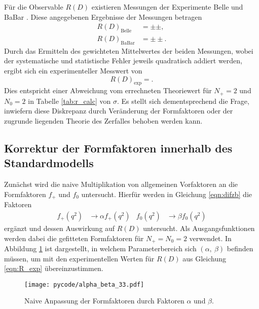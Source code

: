 Für die Observable $R(D)$ existieren Messungen der Experimente Belle \cite{PhysRevD.92.072014} und BaBar \cite{PhysRevLett.109.101802}.
Diese angegebenen Ergebnisse der Messungen betragen
\begin{align*}
  R(D)_\text{Belle} &=  \pm  \pm  ,\\
  R(D)_\text{BaBar} &=  \pm  \pm .
\end{align*}
Durch das Ermitteln des gewichteten Mittelwertes der beiden Messungen, wobei der systematische und statistische Fehler jeweils quadratisch addiert werden, ergibt sich ein experimenteller Messwert von
\begin{equation}
  \label{eqn:R_exp}
  R(D)_\text{exp} = .
\end{equation}
Dies entspricht einer Abweichung vom errechneten Theoriewert für $N_+=\num{2}$ und $N_0=\num{2}$ in Tabelle \ref{tab:r_calc} von $\sigma$.
Es stellt sich dementsprechend die Frage, inwiefern diese Diskrepanz durch Veränderung der Formfaktoren oder der zugrunde liegenden Theorie des Zerfalles behoben werden kann.

\subsection{Korrektur der Formfaktoren innerhalb des Standardmodells}
\label{sec:naiv}
Zunächst wird die naive Multiplikation von allgemeinen Vorfaktoren an die Formfaktoren $f_+$ und $f_0$ untersucht.
Hierfür werden in Gleichung \eqref{eqn:difzb} die Faktoren
\begin{align*}
  f_+(q^2) &\to \alpha f_+(q^2) & f_0(q^2) &\to \beta f_0(q^2)
\end{align*}
ergänzt und dessen Auswirkung auf $R(D)$ untersucht.
Als Ausgangsfunktionen werden dabei die gefitteten Formfaktoren für $N_+ = N_0 = \num{2}$ verwendet.
In Abbildung \ref{fig:alpha_beta} ist dargestellt, in welchem Parameterbereich sich $(\alpha, \: \beta)$ befinden müssen, um mit den experimentellen Werten für $R(D)$ aus Gleichung \eqref{eqn:R_exp} übereinzustimmen.
\begin{figure}
  \centering
  \texttt{[image: pycode/alpha\_beta\_33.pdf]}
  \caption{Naive Anpassung der Formfaktoren durch Faktoren $\alpha$ und $\beta$.}
  \label{fig:alpha_beta}
\end{figure}

